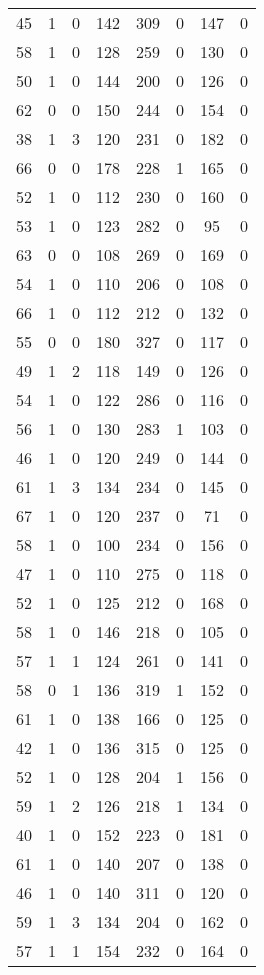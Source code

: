 \documentclass{article}
\begin{document}
\begin{longtable}{*{8}{c}}
45 & 1 & 0 & 142 & 309 & 0 & 147 & 0 \\
58 & 1 & 0 & 128 & 259 & 0 & 130 & 0 \\
50 & 1 & 0 & 144 & 200 & 0 & 126 & 0 \\
62 & 0 & 0 & 150 & 244 & 0 & 154 & 0 \\
38 & 1 & 3 & 120 & 231 & 0 & 182 & 0 \\
66 & 0 & 0 & 178 & 228 & 1 & 165 & 0 \\
52 & 1 & 0 & 112 & 230 & 0 & 160 & 0 \\
53 & 1 & 0 & 123 & 282 & 0 & 95 & 0 \\
63 & 0 & 0 & 108 & 269 & 0 & 169 & 0 \\
54 & 1 & 0 & 110 & 206 & 0 & 108 & 0 \\
66 & 1 & 0 & 112 & 212 & 0 & 132 & 0 \\
55 & 0 & 0 & 180 & 327 & 0 & 117 & 0 \\
49 & 1 & 2 & 118 & 149 & 0 & 126 & 0 \\
54 & 1 & 0 & 122 & 286 & 0 & 116 & 0 \\
56 & 1 & 0 & 130 & 283 & 1 & 103 & 0 \\
46 & 1 & 0 & 120 & 249 & 0 & 144 & 0 \\
61 & 1 & 3 & 134 & 234 & 0 & 145 & 0 \\
67 & 1 & 0 & 120 & 237 & 0 & 71 & 0 \\
58 & 1 & 0 & 100 & 234 & 0 & 156 & 0 \\
47 & 1 & 0 & 110 & 275 & 0 & 118 & 0 \\
52 & 1 & 0 & 125 & 212 & 0 & 168 & 0 \\
58 & 1 & 0 & 146 & 218 & 0 & 105 & 0 \\
57 & 1 & 1 & 124 & 261 & 0 & 141 & 0 \\
58 & 0 & 1 & 136 & 319 & 1 & 152 & 0 \\
61 & 1 & 0 & 138 & 166 & 0 & 125 & 0 \\
42 & 1 & 0 & 136 & 315 & 0 & 125 & 0 \\
52 & 1 & 0 & 128 & 204 & 1 & 156 & 0 \\
59 & 1 & 2 & 126 & 218 & 1 & 134 & 0 \\
40 & 1 & 0 & 152 & 223 & 0 & 181 & 0 \\
61 & 1 & 0 & 140 & 207 & 0 & 138 & 0 \\
46 & 1 & 0 & 140 & 311 & 0 & 120 & 0 \\
59 & 1 & 3 & 134 & 204 & 0 & 162 & 0 \\
57 & 1 & 1 & 154 & 232 & 0 & 164 & 0 \\

\end{longtable}
\end{document}
